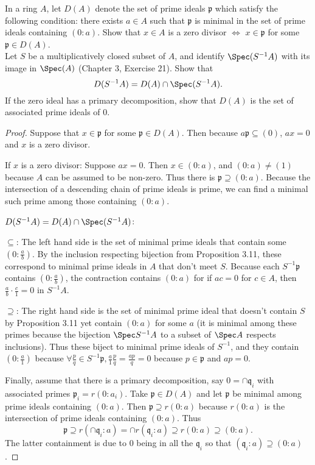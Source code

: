 \begin{exercise}
	In a ring $A$, let $D(A)$ denote the set of prime ideals $\mathfrak{p}$ which satisfy the following condition: there exists $a \in A$ such that $\mathfrak{p}$ is minimal in the set of prime ideals containing $(0:a)$. Show that $x \in A$ is a zero divisor $\iff$ $x \in \mathfrak{p}$ for some $\mathfrak{p} \in D(A)$. \\
	Let $S$ be a multiplicatively closed subset of $A$, and identify $\Spec(S^{-1}A)$ with its image in $\Spec(A)$ (Chapter 3, Exercise 21). Show that
	\[
	D(S^{-1}A) = D(A) \cap \Spec(S^{-1}A).
	\]
	If the zero ideal has a primary decomposition, show that $D(A)$ is the set of associated prime ideals of $0$.
\end{exercise}
\begin{proof}
	Suppose that $x\in \mathfrak{p} $ for some $\mathfrak{p}\in D(A) $.
	Then because $a \mathfrak{p} \subseteq (0) $, $ax = 0 $ and $x $ is a zero divisor.
	
	If $x $ is a zero divisor: 
	Suppose $ax = 0 $.
	Then $x \in (0:a) $, and $(0:a) \ne (1) $ because $A $ can be assumed to be non-zero.
	Thus there is $\mathfrak{p} \supseteq (0:a) $.
	Because the intersection of a descending chain of prime ideals is prime, we can find a minimal such prime among those containing $(0:a) $.

	$D(S^{-1}A) = D(A) \cap \Spec(S^{-1}A)$:

	$\subseteq  $: The left hand side is the set of minimal prime ideals that contain some $(0:\frac{a}{b}) $.
	By the inclusion respecting bijection from Proposition 3.11, these correspond to minimal prime ideals in $A $ that don't meet $S $.
	Because each $S^{-1}\mathfrak{p} $ contains $(0:\frac{a}{b}) $, the contraction contains $(0:a) $ for if $ac = 0 $ for $c\in A $, then $\frac{a}{b}\cdot \frac{c}{1} = 0$ in $S^{-1}A $.

	$\supseteq  $: The right hand side is the set of minimal prime ideal that doesn't contain $S $ by Proposition 3.11 yet contain $(0:a) $ for some $a $ (it is minimal among these primes because the bijection $\Spec S^{-1}A $ to a subset of $\Spec A $ respects inclusions).
	Thus these biject to minimal prime ideals of $S^{-1} $, and they contain $(0:\frac{a}{1}) $ because $\forall \frac{p}{q} \in S^{-1}\mathfrak{p}, \frac{a}{1}\frac{p}{q} = \frac{ap}{q} = 0$ because $p\in \mathfrak{p} $ and $ap = 0 $.

	Finally, assume that there is a primary decomposition, say $0 = \cap \mathfrak{q}_i $ with associated primes $\mathfrak{p}_i = r(0:a_i)$.
	Take $\mathfrak{p} \in D(A) $ and let $\mathfrak{p}$ be minimal among prime ideals containing $(0:a)$.
	Then $\mathfrak{p} \supseteq r(0:a) $ because $r(0:a) $ is the intersection of prime ideals containing $(0:a) $.
	Thus
	\[
		\mathfrak{p} \supseteq r(\cap \mathfrak{q}_i:a) = \cap r(\mathfrak{q}_i:a) \supseteq r(0:a) \supseteq (0:a)
	.\]
	The latter containment is due to $0 $ being in all the $\mathfrak{q}_i $ so that $(\mathfrak{q}_i:a) \supseteq (0:a) $.


\end{proof}

